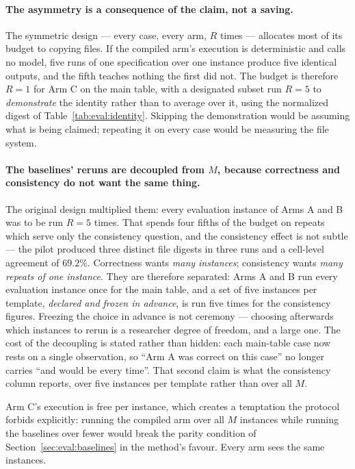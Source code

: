 \paragraph{The asymmetry is a consequence of the claim, not a saving.}
The symmetric design --- every case, every arm, $R$ times --- allocates most of its budget to
copying files. If the compiled arm's execution is deterministic and calls no model, five runs
of one specification over one instance produce five identical outputs, and the fifth teaches
nothing the first did not. The budget is therefore $R=1$ for Arm C on the main table, with a
designated subset run $R=5$ to \emph{demonstrate} the identity rather than to average over it,
using the normalized digest of Table~\ref{tab:eval:identity}. Skipping the demonstration would
be assuming what is being claimed; repeating it on every case would be measuring the file
system.

\paragraph{The baselines' reruns are decoupled from $M$, because correctness and consistency
do not want the same thing.}
The original design multiplied them: every evaluation instance of Arms A and B was to be run
$R=5$ times. That spends four fifths of the budget on repeats which serve only the consistency
question, and the consistency effect is not subtle --- the pilot produced three distinct file
digests in three runs and a cell-level agreement of $69.2\%$. Correctness wants \emph{many
instances}; consistency wants \emph{many repeats of one instance}. They are therefore
separated: Arms A and B run every evaluation instance once for the main table, and a set of
five instances per template, \emph{declared and frozen in advance}, is run five times for the
consistency figures. Freezing the choice in advance is not ceremony --- choosing afterwards
which instances to rerun is a researcher degree of freedom, and a large one. The cost of the
decoupling is stated rather than hidden: each main-table case now rests on a single
observation, so ``Arm A was correct on this case'' no longer carries ``and would be every
time''. That second claim is what the consistency column reports, over five instances per
template rather than over all $M$.

Arm C's execution is free per instance, which creates a temptation the protocol forbids
explicitly: running the compiled arm over all $M$ instances while running the baselines over
fewer would break the parity condition of Section~\ref{sec:eval:baselines} in the method's
favour. Every arm sees the same instances.

